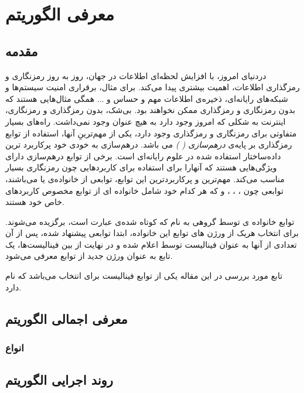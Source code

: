 \chapter{معرفی الگوریتم
}
\section{
	مقدمه
}
دردنیای امروز، با افزایش لحظه‌ای اطلاعات در جهان، روز‌ به ‌روز رمزنگاری و رمزگذاری اطلاعات، اهمیت بیشتری پیدا می‌کند. برای مثال، برقراری امنیت سیستم‌ها و شبکه‌های رایانه‌ای، ذخیره‌ی اطلاعات مهم و حساس و ... همگی مثال‌هایی هستند که بدون رمزنگاری و رمزگذاری ممکن نخواهند بود. بی‌شک، بدون رمزگذاری و رمزنگاری، اینترنت به شکلی که امروز وجود دارد به هیچ عنوان وجود نمی‌داشت.
راه‌های بسیار متفاوتی برای رمزنگاری و رمزگذاری وجود دارد، یکی از مهم‌ترینِ آنها، استفاده از توابع رمزگذاری بر پایه‌ی
\textit{ 
	درهم‌سازی (
	)
}
می باشد. درهم‌سازی به خودی خود پرکاربرد ترین داده‌ساختار استفاده شده در علوم رایانه‌ای است. برخی از توابع درهم‌سازی دارای ویژگی‌هایی هستند که آنهارا برای استفاده برای کاربرد‌هایی چون رمزنگاری بسیار مناسب می‌کند. مهم‌ترین و پرکاربردترین این توابع، توابعی از خانواده‌ی 
\textit{}
یا 
\textit{}
می‌باشند، توابعی چون 
،
،
،
و 
که هر کدام خود شامل خانواده ای از توابع مخصوص کاربرد‌های خاص خود هستند.

توابع خانواده ی 
توسط گروهی به نام 
\textit{}
که کوتاه شده‌ی عبارت
\textit{}
است، برگزیده می‌شوند. برای انتخاب هریک از ورژن های توابع این خانواده، ابتدا توابعی پیشنهاد شده، پس از آن تعدادی از آنها به عنوان فینالیست توسط 
اعلام شده و در نهایت از بین فینالیست‌ها، یک تابع به عنوان ورژن جدید از توابع 
معرفی می‌شود.

تابع مورد بررسی در این مقاله یکی از توابع فینالیست برای انتخاب 
می‌باشد که 
نام دارد. 

\section{
	معرفی اجمالی الگوریتم
}
\subsection{
	انواع
}
\section{
	روند اجرایی الگوریتم
}



